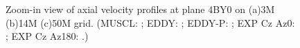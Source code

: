 \begin{figure}[t]
     \caption{Zoom-in view of axial velocity profiles at plane 4BY0 on (a)3M (b)14M (c)50M grid. (MUSCL: \mline; EDDY: \eline; EDDY-P: \epline; EXP Cz Az0: \bluediam; EXP Cz Az180: \reddiam.)}
     \label{zw} 
\end{figure}
